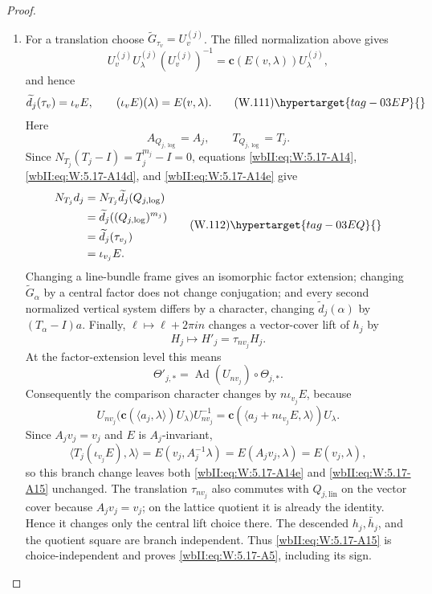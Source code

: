 \begin{proof}
\begin{enumerate}[label=\arabic*.,leftmargin=*]
\item For a translation choose
\(\widetilde G_{\tau_v}=U_v^{(j)}\).  The filled normalization above gives
\[
 U_v^{(j)}U_\lambda^{(j)}(U_v^{(j)})^{-1}
 =\mathbf c(E(v,\lambda))U_\lambda^{(j)},
\]
and hence
\[
 \widetilde d_j(\tau_v)=\iota_vE,\qquad
 (\iota_vE)(\lambda)=E(v,\lambda).
\tag{W.111}\hypertarget{tag-03EP}{}\label{wbII:eq:W:5.17-A14f}
\]
Here
\[
 A_{Q_{j,\log}}=A_j,\qquad T_{Q_{j,\log}}=T_j.
\]
Since \(N_{T_j}(T_j-I)=T_j^{m_j}-I=0\), equations
\eqref{wbII:eq:W:5.17-A14}, \eqref{wbII:eq:W:5.17-A14d}, and \eqref{wbII:eq:W:5.17-A14e} give
\[
\begin{aligned}
 N_{T_j}d_j
 &=N_{T_j}\widetilde d_j(Q_{j,\log})\\
 &=\widetilde d_j((Q_{j,\log})^{m_j})\\
 &=\widetilde d_j(\tau_{v_j})\\
 &=\iota_{v_j}E.
\end{aligned}
\tag{W.112}\hypertarget{tag-03EQ}{}\label{wbII:eq:W:5.17-A15}
\]
Changing a line-bundle frame gives an isomorphic factor extension; changing
\(\widetilde G_\alpha\) by a central factor does not change conjugation; and
every second normalized vertical system differs by a character, changing
\(\widetilde d_j(\alpha)\) by \((T_\alpha-I)a\).  Finally,
\(\ell\mapsto\ell+2\pi in\) changes a vector-cover lift of \(h_j\) by
\[
 H_j\longmapsto H'_j=\tau_{nv_j}H_j.
\]
At the factor-extension level this means
\[
 \Theta'_{j,*}
 =\operatorname{Ad}(U_{nv_j})\circ\Theta_{j,*}.
\]
Consequently the comparison character changes by
\(n\iota_{v_j}E\), because
\[
 U_{nv_j}
 \bigl(\mathbf c(\langle a_j,\lambda\rangle)U_\lambda\bigr)
 U_{nv_j}^{-1}
 =
 \mathbf c(\langle a_j+n\iota_{v_j}E,\lambda\rangle)U_\lambda.
\]
Since \(A_jv_j=v_j\) and \(E\) is \(A_j\)-invariant,
\[
 \langle T_j(\iota_{v_j}E),\lambda\rangle
 =E(v_j,A_j^{-1}\lambda)
 =E(A_jv_j,\lambda)
 =E(v_j,\lambda),
\]
so this branch change leaves both \eqref{wbII:eq:W:5.17-A14e} and \eqref{wbII:eq:W:5.17-A15} unchanged.
The translation \(\tau_{nv_j}\) also commutes with
\(Q_{j,\mathrm{lin}}\) on the vector cover because \(A_jv_j=v_j\); on the
lattice quotient it is already the identity.  Hence it changes only the
central lift choice there.
The descended \(h_j,\bar h_j\), and the quotient square are branch
independent.  Thus \eqref{wbII:eq:W:5.17-A15} is choice-independent and proves \eqref{wbII:eq:W:5.17-A5},
including its sign.


\end{enumerate}
\end{proof}
